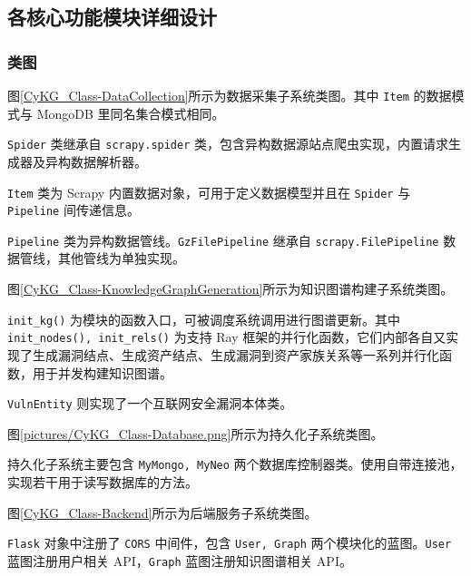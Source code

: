 \documentclass[a4paper,AutoFakeBold,oneside,12pt]{book}
\begin{document}
\subsection{各核心功能模块详细设计}

\subsubsection{类图}

图\ref{CyKG_Class-DataCollection}所示为数据采集子系统类图。其中 \lstinline|Item| 的数据模式与 MongoDB 里同名集合模式相同。

\lstinline|Spider| 类继承自 \lstinline|scrapy.spider| 类，包含异构数据源站点爬虫实现，内置请求生成器及异构数据解析器。

\lstinline|Item| 类为 Scrapy 内置数据对象，可用于定义数据模型并且在 \lstinline|Spider| 与 \lstinline|Pipeline| 间传递信息。

\lstinline|Pipeline| 类为异构数据管线。\lstinline|GzFilePipeline| 继承自 \lstinline|scrapy.FilePipeline| 数据管线，其他管线为单独实现。


图\ref{CyKG_Class-KnowledgeGraphGeneration}所示为知识图谱构建子系统类图。

\lstinline|init_kg()| 为模块的函数入口，可被调度系统调用进行图谱更新。其中 \lstinline|init_nodes(), init_rels()| 为支持 Ray 框架的并行化函数，它们内部各自又实现了生成漏洞结点、生成资产结点、生成漏洞到资产家族关系等一系列并行化函数，用于并发构建知识图谱。

\lstinline|VulnEntity| 则实现了一个互联网安全漏洞本体类。


图\ref{pictures/CyKG_Class-Database.png}所示为持久化子系统类图。

持久化子系统主要包含 \lstinline|MyMongo, MyNeo| 两个数据库控制器类。使用自带连接池，实现若干用于读写数据库的方法。


图\ref{CyKG_Class-Backend}所示为后端服务子系统类图。

\lstinline|Flask| 对象中注册了 \lstinline|CORS| 中间件，包含 \lstinline|User, Graph| 两个模块化的蓝图。\lstinline|User| 蓝图注册用户相关 API，\lstinline|Graph| 蓝图注册知识图谱相关 API。
\end{document}
